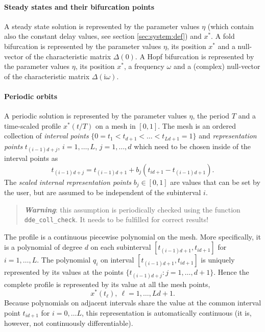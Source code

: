 \documentclass[10pt]{scrartcl}
\newcommand{\define}[1]{\emph{#1}}
\renewcommand{\i}{\mathrm{i}}
\newcommand{\blist}[1]{\mbox{\lstinline!#1!}}
\begin{document}
\paragraph{Steady states and their bifurcation points}
A steady state solution is represented by the parameter values
$\eta$ (which contain also the constant delay values, 
see section \ref{sec:system:def})
and $x^*$. A fold bifurcation is represented by the parameter
values $\eta$, its position $x^*$ and a null-vector of the
characteristic matrix $\Delta(0)$. A Hopf bifurcation is represented 
by the parameter
values $\eta$, its position $x^*$, a frequency $\omega$
and a (complex) null-vector of the
characteristic matrix $\Delta(\i \omega)$.

\paragraph{Periodic orbits}
A periodic solution is represented by the parameter
values $\eta$, the period $T$ and 
a time-scaled profile $x^*(t/T)$ on a mesh in $[0,1]$.
The mesh is an ordered 
collection of \define{interval points} $\{0=t_1<t_{d+1}<\ldots<t_{Ld+1}=1\}$
and \define{representation points} $t_{(i-1)d+j}$, $i=1,\ldots,L$,
$j=1,\ldots,d$ which need to be chosen inside of the interval points as
\[
t_{(i-1)d+j}=t_{(i-1)d+1}+b_j(t_{id+1}-t_{(i-1)d+1})\mbox{.}
\]
The \define{scaled internal representation points} $b_j\in[0,1]$ are values that can be set by the user, but
are assumed to be independent of the subinterval $i$.
\begin{quote}
  \textbf{\emph{Warning}}: this assumption is periodically checked
  using the function \blist{dde_coll_check}. It needs to be fulfilled
  for correct results!
\end{quote}
The profile is a continuous piecewise polynomial on the mesh. 
More specifically, it is
a polynomial of degree $d$ on each
subinterval $[t_{(i-1)d+1},t_{id+1}]$ for $i=1,\ldots,L$.
The polynomial $q_i$ on interval $[t_{(i-1)d+1},t_{id+1}]$ is uniquely represented
by its values at the points $\{t_{(i-1)d+j}: j=1,\ldots,d+1\}$.
Hence the complete profile is represented by
its value at all the mesh points,
\[
x^*\left(t_\ell\right),\ \ell=1,\ldots,Ld+1\mbox{.}
\]
Because polynomials on adjacent intervals share the value at the
common interval point $t_{id+1}$ for $i=0,\ldots L$, this
representation is automatically continuous (it is, however, not
continuously differentiable).
\end{document}
